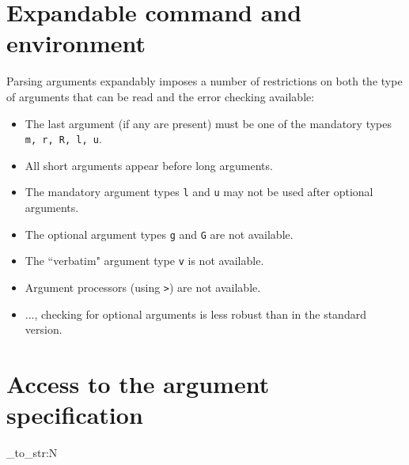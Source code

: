 \documentclass{article}
\begin{document}
\section{Expandable command and environment}
Parsing arguments expandably imposes a number of restrictions on both the type of
arguments that can be read and the error checking available:
\begin{itemize}
  \item The last argument (if any are present) must be one of the mandatory types \texttt{m, r, R, l, u}.
  \item All short arguments appear before long arguments.
  \item The mandatory argument types \texttt{l} and \texttt{u} may not be used after optional arguments.
  \item The optional argument types \texttt{g} and \texttt{G} are not available.
  \item The ``verbatim" argument type \texttt{v} is not available.
  \item Argument processors (using \texttt{>}) are not available.
  \item ..., checking for optional arguments is less robust than in the standard version.
\end{itemize}

\section{Access to the argument specification}
\begin{code}
\ExplSyntaxOn
\NewDocumentCommand{}
\GetDocumentCommandArgSpec \foo
\tl_to_str:N \ArgumentSpecification
\ExplSyntaxOff
\end{code}
\end{document}
